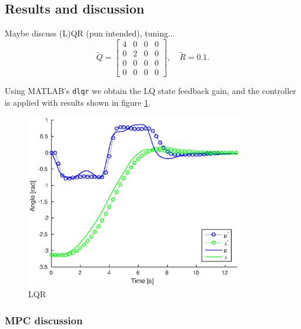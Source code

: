 \subsection{Results and discussion}
Maybe discuss (L)QR (pun intended), tuning...
\begin{equation*}
\tilde{Q} = \begin{bmatrix}4&0&0&0\\0&2&0&0\\0&0&0&0\\0&0&0&0\end{bmatrix}, \quad \tilde{R} = 0.1.
\end{equation*}

Using MATLAB's \texttt{dlqr} we obtain the LQ state feedback gain, and the controller is applied with results shown in figure \ref{fig:lqr}.

\begin{figure}[hp]
	\centering
		\includegraphics[width=0.85\textwidth]{figures/3/closedloop.eps}
	\caption{LQR}
	\label{fig:lqr}
\end{figure}

\subsubsection{MPC discussion}

